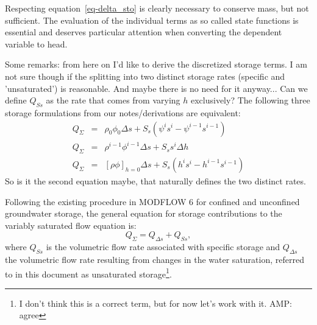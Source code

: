\documentclass[fleqn]{article}
\begin{document}
Respecting equation~\ref{eq-delta_sto} is clearly necessary to conserve
mass, but not sufficient. The evaluation of the individual terms
as so called state functions is essential and deserves particular
attention when converting the dependent variable to head.

{\color{blue}
Some remarks: from here on I'd like to derive the discretized storage terms.
I am not sure though if the splitting into two distinct storage
rates (specific and 'unsaturated') is reasonable. And maybe there
is no need for it anyway... Can we define $Q_{Ss}$ as the rate 
that comes from varying $h$ exclusively? The following three
storage formulations from our notes/derivations are equivalent:
\begin{eqnarray}
  Q_\Sigma &=& \rho_0 \phi_0 \Delta s + 
    S_s \left( \psi^i s^i - \psi^{i-1} s^{i-1} \right) \\
  Q_\Sigma &=& \rho^{i-1} \phi^{i-1} \Delta s + 
    S_s s^i \Delta h \\
  Q_\Sigma &=& [\rho \phi]_{h=0} \Delta s + 
    S_s \left( h^i s^i - h^{i-1} s^{i-1} \right)
\end{eqnarray}
So is it the second equation maybe, that naturally defines the two
distinct rates.
}

Following the existing procedure in MODFLOW 6 for confined and
unconfined groundwater storage, the general equation for storage
contributions to the variably saturated flow equation is:
\begin{equation}
  Q_{\Sigma} = Q_{\Delta s} + Q_{Ss},
\end{equation}
where $Q_{Ss}$ is the volumetric flow rate associated with specific
storage and $Q_{\Delta s}$ the volumetric flow rate resulting from
changes in the water saturation, referred to in this document
as unsaturated storage\footnote{
  I don't think this is a correct term,
  but for now let's work with it. AMP: agree
}.
\end{document}
